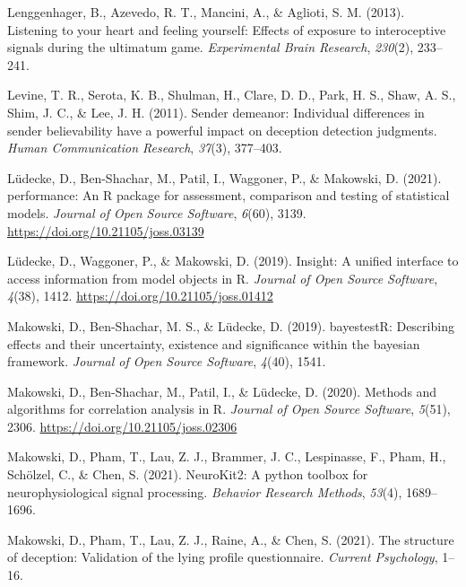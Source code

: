 \documentclass[
  man,floatsintext]{apa6}
\newlength{\cslhangindent}
\newlength{\cslentryspacingunit} %
\newenvironment{CSLReferences}[2] %
 {%
  \setlength{\parindent}{0pt}
  \ifodd #1
  \let\oldpar\par
  \def\par{\hangindent=\cslhangindent\oldpar}
  \fi
  \setlength{\parskip}{#2\cslentryspacingunit}
 }%
 {}
\begin{document}
\begin{CSLReferences}{1}{0}
\leavevmode{}%
Lenggenhager, B., Azevedo, R. T., Mancini, A., \& Aglioti, S. M. (2013). Listening to your heart and feeling yourself: Effects of exposure to interoceptive signals during the ultimatum game. \emph{Experimental Brain Research}, \emph{230}(2), 233--241.

\leavevmode{}%
Levine, T. R., Serota, K. B., Shulman, H., Clare, D. D., Park, H. S., Shaw, A. S., Shim, J. C., \& Lee, J. H. (2011). Sender demeanor: Individual differences in sender believability have a powerful impact on deception detection judgments. \emph{Human Communication Research}, \emph{37}(3), 377--403.

\leavevmode{}%
Lüdecke, D., Ben-Shachar, M., Patil, I., Waggoner, P., \& Makowski, D. (2021). {performance}: An {R} package for assessment, comparison and testing of statistical models. \emph{Journal of Open Source Software}, \emph{6}(60), 3139. \url{https://doi.org/10.21105/joss.03139}

\leavevmode{}%
Lüdecke, D., Waggoner, P., \& Makowski, D. (2019). Insight: A unified interface to access information from model objects in {R}. \emph{Journal of Open Source Software}, \emph{4}(38), 1412. \url{https://doi.org/10.21105/joss.01412}

\leavevmode{}%
Makowski, D., Ben-Shachar, M. S., \& Lüdecke, D. (2019). bayestestR: Describing effects and their uncertainty, existence and significance within the bayesian framework. \emph{Journal of Open Source Software}, \emph{4}(40), 1541.

\leavevmode{}%
Makowski, D., Ben-Shachar, M., Patil, I., \& Lüdecke, D. (2020). Methods and algorithms for correlation analysis in {R}. \emph{Journal of Open Source Software}, \emph{5}(51), 2306. \url{https://doi.org/10.21105/joss.02306}

\leavevmode{}%
Makowski, D., Pham, T., Lau, Z. J., Brammer, J. C., Lespinasse, F., Pham, H., Schölzel, C., \& Chen, S. (2021). NeuroKit2: A python toolbox for neurophysiological signal processing. \emph{Behavior Research Methods}, \emph{53}(4), 1689--1696.

\leavevmode{}%
Makowski, D., Pham, T., Lau, Z. J., Raine, A., \& Chen, S. (2021). The structure of deception: Validation of the lying profile questionnaire. \emph{Current Psychology}, 1--16.


\end{CSLReferences}
\end{document}
